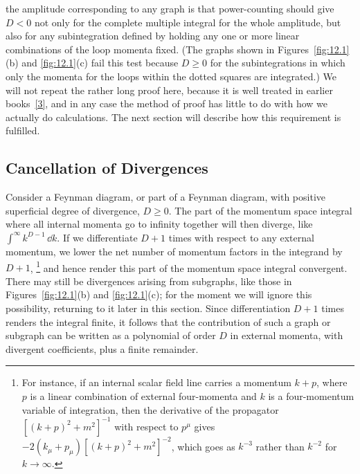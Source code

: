 
the amplitude corresponding to any graph is that power-counting should
give $D<0$ not only for the complete multiple integral for the whole
amplitude, but also for any subintegration defined by holding any one
or more linear combinations of the loop momenta fixed. (The graphs
shown in Figures~\ref{fig:12.1}(b) and
\ref{fig:12.1}(c) fail this test because $D\geq0$ for the
subintegrations in which only the momenta for the loops within the dotted
squares are integrated.) We will not repeat the rather long proof here,
because it is well treated in earlier books~\hyperref[ref:12.3]{[3]}, and
in any case the method of proof has little to do with how we actually do
calculations. The next section will describe how this requirement is
fulfilled.

\subsection{Cancellation of Divergences}\label{sec:12.2}

Consider a Feynman diagram, or part of a Feynman diagram, with positive
superficial degree of divergence, $D\geq0$. The part of the momentum space
integral where all internal momenta go to infinity together will then
diverge, like $\int^\infty k^{D-1}\,\dd k$. If we differentiate $D+1$ times
with respect to any external momentum, we lower the net number of momentum
factors in the integrand by $D+1$,
\footnote{For instance, if an internal scalar field line carries a momentum
$k+p$, where $p$ is a linear combination of external four-momenta and $k$ is
a four-momentum variable of integration, then the derivative of the
propagator $[(k+p)^2+m^2]^{-1}$ with respect to $p^\mu$ gives
$-2(k_\mu+p_\mu)[(k+p)^2+m^2]^{-2}$, which goes as $k^{-3}$ rather than
$k^{-2}$ for $k\to\infty$.}
and hence render this part of the momentum space integral convergent. There
may still be divergences arising from subgraphs, like those in
Figures~\ref{fig:12.1}(b) and \ref{fig:12.1}(c); for the
moment we will ignore this possibility, returning to it later in this
section. Since differentiation $D+1$ times renders the integral finite, it
follows that the contribution of such a graph or subgraph can be written as
a polynomial of order $D$ in external momenta, with divergent coefficients,
plus a finite remainder.

